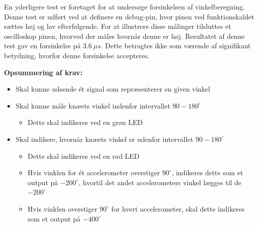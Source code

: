 \noindent
En yderligere test er foretaget for at undersøge forsinkelsen af vinkelberegning. Denne test er udført ved at definere en debug-pin, hvor pinen ved funktionskaldet sættes høj og lav efterfølgende. For at illustrere disse målinger tilsluttes et oscilloskop pinen, hvorved der måles hvornår denne er høj. Resultatet af denne test gav en forsinkelse på  $3.6~\mu s$. Dette betragtes ikke som værende af signifikant betydning, hvorfor denne forsinkelse accepteres.


\vspace{3mm}
\textbf{Opsummering af krav:}
\begin{itemize}
\item[\text{\sffamily \checkmark}] Skal kunne udsende ét signal som repræsenterer en given vinkel
\item[\text{\sffamily \checkmark}] Skal kunne måle knæets vinkel indenfor intervallet $90-180^{\circ}$
\begin{itemize}
\item Dette skal indikeres ved en grøn LED
\end{itemize}
\item[\text{\sffamily \checkmark}] Skal indikere, hvornår knæets vinkel er udenfor intervallet $90-180^{\circ}$
\begin{itemize}
\item Dette skal indikeres ved en rød LED
\item Hvis vinklen for ét accelerometer overstiger $90^{\circ}$, indikeres dette som et output på $-200^{\circ}$, hvortil det andet accelerometers vinkel lægges til de $-200^{\circ}$
\item Hvis vinklen overstiger $90^{\circ}$ for hvert accelerometer, skal dette indikeres som et output på $-400^{\circ}$
\end{itemize}
\end{itemize}